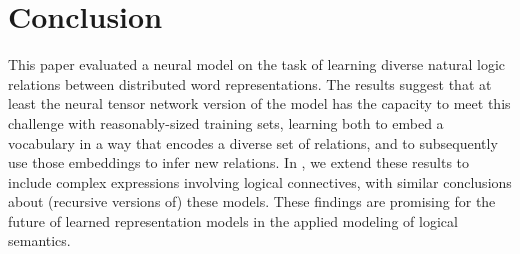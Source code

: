 \section{Conclusion}\label{sec:discussion}

This paper evaluated a neural model on the task of learning diverse
natural logic relations between distributed word representations. The
results suggest that at least the neural tensor network version of the
model has the capacity to
meet this challenge with reasonably-sized training sets, learning both 
to embed a vocabulary in a way that encodes a diverse
set of relations, and to subsequently use those embeddings to infer new
relations. In
\cite{Bowman:Potts:Manning:2014}, we extend these results to include
complex expressions involving logical connectives, with similar
conclusions about (recursive versions of) these models. These findings
are promising for the future of learned representation models in the
applied modeling of logical semantics.

%
%
%

